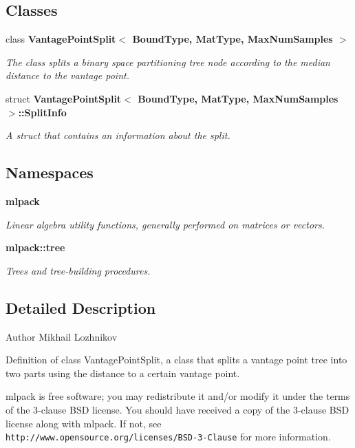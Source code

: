 \subsection*{Classes}
\begin{DoxyCompactItemize}
\item 
class \textbf{ Vantage\+Point\+Split$<$ Bound\+Type, Mat\+Type, Max\+Num\+Samples $>$}
\begin{DoxyCompactList}\small\item\em The class splits a binary space partitioning tree node according to the median distance to the vantage point. \end{DoxyCompactList}\item 
struct \textbf{ Vantage\+Point\+Split$<$ Bound\+Type, Mat\+Type, Max\+Num\+Samples $>$\+::\+Split\+Info}
\begin{DoxyCompactList}\small\item\em A struct that contains an information about the split. \end{DoxyCompactList}\end{DoxyCompactItemize}
\subsection*{Namespaces}
\begin{DoxyCompactItemize}
\item 
 \textbf{ mlpack}
\begin{DoxyCompactList}\small\item\em Linear algebra utility functions, generally performed on matrices or vectors. \end{DoxyCompactList}\item 
 \textbf{ mlpack\+::tree}
\begin{DoxyCompactList}\small\item\em Trees and tree-\/building procedures. \end{DoxyCompactList}\end{DoxyCompactItemize}


\subsection{Detailed Description}
\begin{DoxyAuthor}{Author}
Mikhail Lozhnikov
\end{DoxyAuthor}
Definition of class Vantage\+Point\+Split, a class that splits a vantage point tree into two parts using the distance to a certain vantage point.

mlpack is free software; you may redistribute it and/or modify it under the terms of the 3-\/clause B\+SD license. You should have received a copy of the 3-\/clause B\+SD license along with mlpack. If not, see {\tt http\+://www.\+opensource.\+org/licenses/\+B\+S\+D-\/3-\/\+Clause} for more information. 